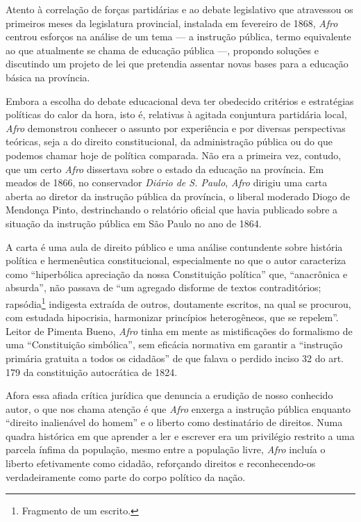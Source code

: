 Atento à correlação de forças partidárias e ao debate legislativo que
atravessou os primeiros meses da legislatura provincial, instalada em
fevereiro de 1868, \emph{Afro} centrou esforços na análise de um tema ---
a instrução pública, termo equivalente ao que atualmente se chama de
educação pública ---, propondo soluções e discutindo um projeto de lei
que pretendia assentar novas bases para a educação básica na província.

Embora a escolha do debate educacional deva ter obedecido critérios e
estratégias políticas do calor da hora, isto é, relativas à agitada
conjuntura partidária local, \emph{Afro} demonstrou conhecer o assunto
por experiência e por diversas perspectivas teóricas, seja a do direito
constitucional, da administração pública ou do que podemos chamar hoje
de política comparada. Não era a primeira vez, contudo, que um certo
\emph{Afro} dissertava sobre o estado da educação na província. Em
meados de 1866, no conservador \emph{Diário de S. Paulo}, \emph{Afro}
dirigiu uma carta aberta ao diretor da instrução pública da província, o
liberal moderado Diogo de Mendonça Pinto, destrinchando o relatório
oficial que havia publicado sobre a situação da instrução pública em São
Paulo no ano de 1864.

A carta é uma aula de direito público e uma análise contundente sobre
história política e hermenêutica constitucional, especialmente no que o
autor caracteriza como ``hiperbólica apreciação da nossa Constituição
política'' que, ``anacrônica e absurda'', não passava de ``um agregado
disforme de textos contraditórios; rapsódia\footnote{Fragmento de um
  escrito.} indigesta extraída de outros, doutamente escritos, na qual
se procurou, com estudada hipocrisia, harmonizar princípios
heterogêneos, que se repelem''. Leitor de Pimenta Bueno, \emph{Afro}
tinha em mente as mistificações do formalismo de uma ``Constituição
simbólica'', sem eficácia normativa em garantir a ``instrução primária
gratuita a todos os cidadãos'' de que falava o perdido inciso 32 do art.
179 da constituição autocrática de 1824.

Afora essa afiada crítica jurídica que denuncia a erudição de nosso
conhecido autor, o que nos chama atenção é que \emph{Afro} enxerga a
instrução pública enquanto ``direito inalienável do homem'' e o liberto
como destinatário de direitos. Numa quadra histórica em que aprender a
ler e escrever era um privilégio restrito a uma parcela ínfima da
população, mesmo entre a população livre, \emph{Afro} incluía o liberto
efetivamente como cidadão, reforçando direitos e reconhecendo-os
verdadeiramente como parte do corpo político da nação.

